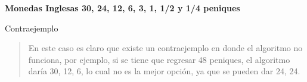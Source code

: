 \textbf{Monedas Inglesas 30, 24, 12, 6, 3, 1, 1/2 y 1/4 peniques}\vspace{.2cm}

\textcolor{bibi}{Contraejemplo}
\begin{quote}
    En este caso es claro que existe un contraejemplo en donde el algoritmo no funciona, por ejemplo, si se tiene que regresar 48 peniques, el algoritmo daría 30, 12, 6, lo cual no es la mejor opción, ya que se pueden dar 24, 24. \vspace{.2cm}
\end{quote}